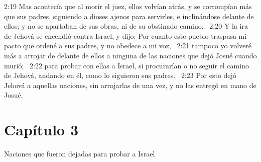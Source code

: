 2:19 Mas acontecía que al morir el juez, ellos volvían atrás, y se corrompían más que sus padres, siguiendo a dioses ajenos para servirles, e inclinándose delante de ellos; y no se apartaban de sus obras, ni de su obstinado camino.  
2:20 Y la ira de Jehová se encendió contra Israel, y dijo: Por cuanto este pueblo traspasa mi pacto que ordené a sus padres, y no obedece a mi voz,  
2:21 tampoco yo volveré más a arrojar de delante de ellos a ninguna de las naciones que dejó Josué cuando murió;  
2:22 para probar con ellas a Israel, si procurarían o no seguir el camino de Jehová, andando en él, como lo siguieron sus padres.  
2:23 Por esto dejó Jehová a aquellas naciones, sin arrojarlas de una vez, y no las entregó en mano de Josué.  
\section*{Capítulo 3}
Naciones que fueron dejadas para probar a Israel  

